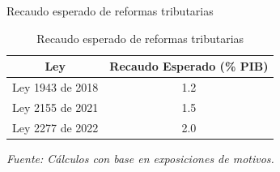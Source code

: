 \begin{frame}{Recaudo esperado de reformas tributarias}
\begin{table}[h]
    \caption{Recaudo esperado de reformas tributarias}
    \label{tab:tax:summ}
    \centering
    \begin{tabular}{|c|c|}
        \hline
        \textbf{Ley} & \textbf{Recaudo Esperado (\% PIB)} \\
        \hline
        Ley 1943 de 2018 & 1.2 \\
        \hline
        Ley 2155 de 2021 & 1.5 \\
        \hline
        Ley 2277 de 2022 & 2.0 \\
        \hline
    \end{tabular}
\vspace{0.3cm}
\par\footnotesize{\textit{Fuente: Cálculos con base en exposiciones de motivos.}}    
\end{table}
\end{frame}
